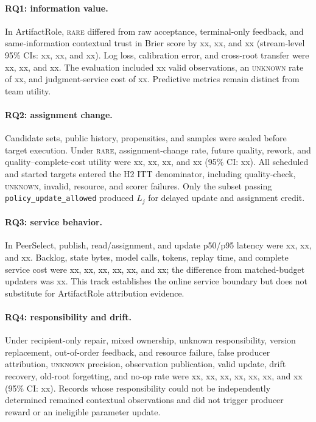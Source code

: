 \documentclass[sigconf,anonymous]{aamas}
\newcommand{\rare}{\textsc{rare}}
\newcommand{\unknown}{\textsc{unknown}}
\begin{document}
\paragraph{RQ1: information value.} In ArtifactRole, \rare{} differed from raw acceptance, terminal-only feedback, and same-information contextual trust in Brier score by xx, xx, and xx (stream-level 95\% CIs: xx, xx, and xx). Log loss, calibration error, and cross-root transfer were xx, xx, and xx. The evaluation included xx valid observations, an \unknown{} rate of xx, and judgment-service cost of xx. Predictive metrics remain distinct from team utility.

\paragraph{RQ2: assignment change.} Candidate sets, public history, propensities, and samples were sealed before target execution. Under \rare{}, assignment-change rate, future quality, rework, and quality--complete-cost utility were xx, xx, xx, and xx (95\% CI: xx). All scheduled and started targets entered the H2 ITT denominator, including quality-check, \unknown{}, invalid, resource, and scorer failures. Only the subset passing \texttt{policy\_update\_allowed} produced $L_j$ for delayed update and assignment credit.

\paragraph{RQ3: service behavior.} In PeerSelect, publish, read/assignment, and update p50/p95 latency were xx, xx, and xx. Backlog, state bytes, model calls, tokens, replay time, and complete service cost were xx, xx, xx, xx, xx, and xx; the difference from matched-budget updaters was xx. This track establishes the online service boundary but does not substitute for ArtifactRole attribution evidence.

\paragraph{RQ4: responsibility and drift.} Under recipient-only repair, mixed ownership, unknown responsibility, version replacement, out-of-order feedback, and resource failure, false producer attribution, \unknown{} precision, observation publication, valid update, drift recovery, old-root forgetting, and no-op rate were xx, xx, xx, xx, xx, xx, and xx (95\% CI: xx). Records whose responsibility could not be independently determined remained contextual observations and did not trigger producer reward or an ineligible parameter update.
\end{document}
